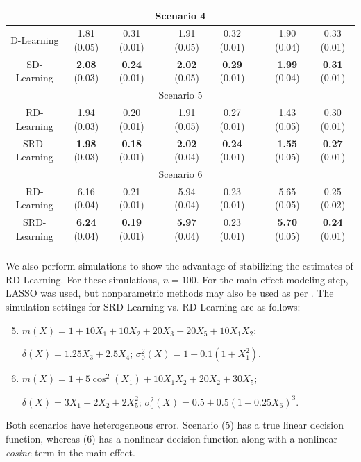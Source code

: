 \documentclass[useAMS,usenatbib]{biom}
\begin{document}
\begin{table}
\begin{tabular}{c c c c c c c c c}
    \hline
    \multicolumn{9}{c}{Scenario 4} \\
    \hline
    D-Learning & 1.81 (0.05) & 0.31 (0.01) & & 1.91 (0.05) & 0.32 (0.01) & & 1.90 (0.04) & 0.33 (0.01) \\
    SD-Learning & \textbf{2.08} (0.03) & \textbf{0.24} (0.01) & & \textbf{2.02} (0.05) & \textbf{0.29} (0.01) & & \textbf{1.99} (0.04) & \textbf{0.31} (0.01)\\
    \hline
    \multicolumn{9}{c}{Scenario 5} \\
    \hline
    RD-Learning & 1.94 (0.03) & 0.20 (0.01) & & 1.91 (0.05) & 0.27 (0.01) & & 1.43 (0.05) & 0.30 (0.01)\\
    SRD-Learning & \textbf{1.98} (0.03) & \textbf{0.18} (0.01) & & \textbf{2.02} (0.04) & \textbf{0.24} (0.01) & & \textbf{1.55} (0.05) & \textbf{0.27} (0.01)\\
    \hline
    \multicolumn{9}{c}{Scenario 6} \\
    \hline
    RD-Learning & 6.16 (0.04) & 0.21 (0.01) & & 5.94 (0.04) & 0.23 (0.01) & & 5.65 (0.05) & 0.25 (0.02) \\
    SRD-Learning & \textbf{6.24} (0.04) & \textbf{0.19} (0.01) & & \textbf{5.97} (0.04) & 0.23 (0.01) & & \textbf{5.70} (0.05) & \textbf{0.24} (0.01)\\
    \hline \hline \\
    \end{tabular}
\end{table}

We also perform simulations to show the advantage of stabilizing the estimates of RD-Learning. For these simulations, $n=100$. For the main effect modeling step, LASSO was used, but nonparametric methods may also be used as per \cite{meng_doubly_2021}. The simulation settings for SRD-Learning vs. RD-Learning are as follows:
\begin{enumerate}
\setcounter{enumi}{4}
    \item $m(X) = 1 + 10X_1 + 10X_2 + 20X_3 + 20X_5 + 10X_1X_2$; 
    
    \noindent $\delta(X) = 1.25X_3 + 2.5X_4$; $\sigma_0^2(X) = 1+0.1(1 + X_1^2)$.
    \item $m(X) = 1 + 5\cos^2(X_1) + 10X_1X_2 + 20X_2 + 30X_5$; 
    
    \noindent $\delta(X) = 3X_1 + 2X_2 + 2X_5^2$; $\sigma_0^2(X) = 0.5 + 0.5\left( 1 - 0.25X_6 \right)^3$.
\end{enumerate}

Both scenarios have heterogeneous error. Scenario (5) has a true linear decision function, whereas (6) has a nonlinear decision function along with a nonlinear \textit{cosine} term in the main effect. 
\end{document}
